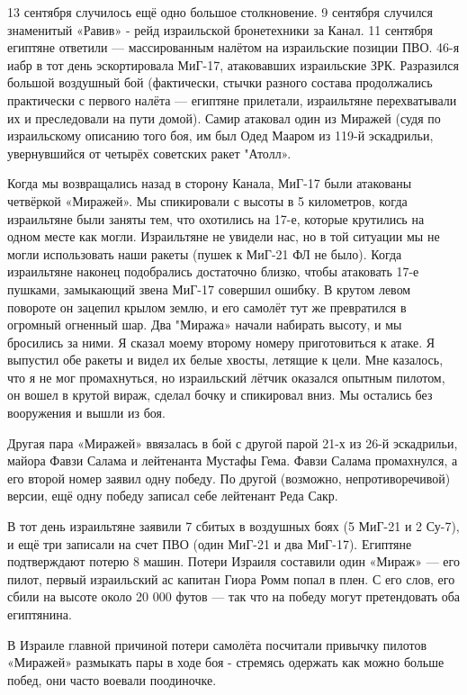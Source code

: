 13 сентября случилось ещё одно большое столкновение. 9 сентября случился знаменитый «Равив» - рейд израильской бронетехники за Канал. 11 сентября египтяне ответили — массированным налётом на израильские позиции ПВО. 46-я иабр в тот день эскортировала МиГ-17, атаковавших израильские ЗРК. Разразился большой воздушный бой (фактически, стычки разного состава продолжались практически с первого налёта — египтяне прилетали, израильтяне перехватывали их и преследовали на пути домой). Самир атаковал один из Миражей (судя по израильскому описанию того боя, им был Одед Мааром из 119-й эскадрильи, увернувшийся от четырёх советских ракет "Атолл».

\begin{textcitation}
	Когда мы возвращались назад в сторону Канала, МиГ-17 были атакованы четвёркой «Миражей». Мы спикировали с высоты в 5 километров, когда израильтяне были заняты тем, что охотились на 17-е, которые крутились на одном месте как могли. Израильтяне не увидели нас, но в той ситуации мы не могли использовать наши ракеты (пушек к МиГ-21 ФЛ не было). Когда израильтяне наконец подобрались достаточно близко, чтобы атаковать 17-е пушками, замыкающий звена МиГ-17 совершил ошибку. В крутом левом повороте он зацепил крылом землю, и его самолёт тут же превратился в огромный огненный шар. Два "Миража» начали набирать высоту, и мы бросились за ними. Я сказал моему второму номеру приготовиться к атаке. Я выпустил обе ракеты и видел их белые хвосты, летящие к цели. Мне казалось, что я не мог промахнуться, но израильский лётчик оказался опытным пилотом, он вошел в крутой вираж, сделал бочку и спикировал вниз. Мы остались без вооружения и вышли из боя. 
\end{textcitation}

Другая пара «Миражей» ввязалась в бой с другой парой 21-х из 26-й эскадрильи, майора Фавзи Салама и лейтенанта Мустафы Гема. Фавзи Салама промахнулся, а его второй номер заявил одну победу. По другой (возможно, непротиворечивой) версии, ещё одну победу записал себе лейтенант Реда Сакр.

В тот день израильтяне заявили 7 сбитых в воздушных боях (5 МиГ-21 и 2 Су-7), и ещё три записали на счет ПВО (один МиГ-21 и два МиГ-17). Египтяне подтверждают потерю 8 машин. Потери Израиля составили один «Мираж» — его пилот, первый израильский ас капитан Гиора Ромм попал в плен. С его слов, его сбили на высоте около 20 000 футов — так что на победу могут претендовать оба египтянина.

В Израиле главной причиной потери самолёта посчитали привычку пилотов «Миражей» размыкать пары в ходе боя - стремясь одержать как можно больше побед, они часто воевали поодиночке.

